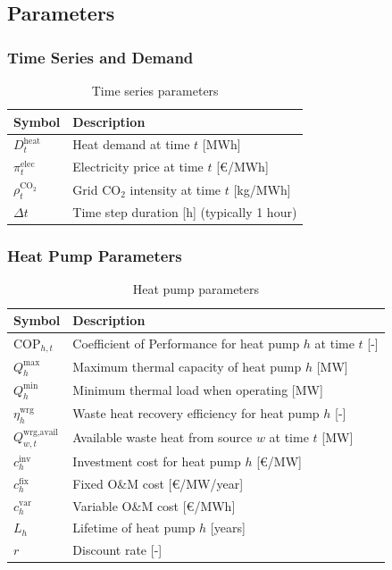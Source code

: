 \documentclass[11pt]{article}
\begin{document}
\subsection{Parameters}

\subsubsection{Time Series and Demand}

\begin{table}[h]
\centering
\begin{tabular}{ll}
\toprule
\textbf{Symbol} & \textbf{Description} \\
\midrule
$D_t^{\text{heat}}$ & Heat demand at time $t$ [MWh] \\
$\pi_t^{\text{elec}}$ & Electricity price at time $t$ [\euro/MWh] \\
$\rho_t^{\text{CO}_2}$ & Grid CO$_2$ intensity at time $t$ [kg/MWh] \\
$\Delta t$ & Time step duration [h] (typically 1 hour) \\
\bottomrule
\end{tabular}
\caption{Time series parameters}
\label{tab:params_timeseries}
\end{table}

\subsubsection{Heat Pump Parameters}

\begin{table}[h]
\centering
\begin{tabular}{ll}
\toprule
\textbf{Symbol} & \textbf{Description} \\
\midrule
$\text{COP}_{h,t}$ & Coefficient of Performance for heat pump $h$ at time $t$ [-] \\
$Q_{h}^{\text{max}}$ & Maximum thermal capacity of heat pump $h$ [MW] \\
$Q_{h}^{\text{min}}$ & Minimum thermal load when operating [MW] \\
$\eta_{h}^{\text{wrg}}$ & Waste heat recovery efficiency for heat pump $h$ [-] \\
$Q_{w,t}^{\text{wrg,avail}}$ & Available waste heat from source $w$ at time $t$ [MW] \\
$c_{h}^{\text{inv}}$ & Investment cost for heat pump $h$ [\euro/MW] \\
$c_{h}^{\text{fix}}$ & Fixed O\&M cost [\euro/MW/year] \\
$c_{h}^{\text{var}}$ & Variable O\&M cost [\euro/MWh] \\
$L_h$ & Lifetime of heat pump $h$ [years] \\
$r$ & Discount rate [-] \\
\bottomrule
\end{tabular}
\caption{Heat pump parameters}
\label{tab:params_hp}
\end{table}
\end{document}
